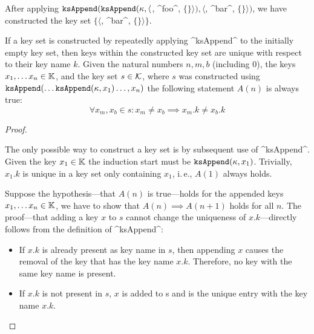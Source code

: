 \begin{example}
After applying $\texttt{ksAppend} (\texttt{ksAppend} (\kappa, \langle$, ^foo^, $\{ \}\rangle), \langle$\linebreak{}, ^bar^, $\{ \}\rangle)$, we have constructed the key set $\{ \langle$, ^bar^, $\{ \}\rangle \}$.
\end{example}

\begin{lemma}
If a key set is constructed by repeatedly applying ^ksAppend^ to the initially empty key set, then keys within the constructed key set are unique with respect to their key name $k$.
Given the natural numbers $n, m, b$ (including $0$), the keys $x_1, \ldots x_n \in \mathbb{K}$, and the key set $s \in \mathcal{K}$, where $s$ was constructed using $\texttt{ksAppend} (\ldots \texttt{ksAppend} (\kappa, x_1)  \ldots, x_n)$ the following statement $A(n)$ is always true:
\begin{equation}
\forall x_m, x_b \in s : x_m \neq x_b \implies x_m.k \neq x_b.k
\end{equation}
\vspace{-2em}
\end{lemma}

\begin{proof}
\begin{description}[font=\textit]
\item[Base case:] The only possible way to construct a key set is by subsequent use of ^ksAppend^.
Given the key $x_1 \in \mathbb{K}$ the induction start must be $\texttt{ksAppend} (\kappa, x_1)$.
Trivially, $x_1.k$ is unique in a key set only containing $x_1$, i.\,e., $A(1)$ always holds.
\item[Induction step:] Suppose the hypothesis---that $A(n)$ is true---holds for the appended keys $x_1, \ldots x_n \in \mathbb{K}$, we have to show that $A(n) \implies A(n+1)$ holds for all $n$.
The proof---that adding a key $x$ to $s$ cannot change the uniqueness of $x.k$---directly follows from the definition of ^ksAppend^:
\begin{itemize}
\item If $x.k$ is already present as key name in $s$, then appending $x$ causes the removal of the key that has the key name $x.k$.
Therefore, no key with the same key name is present.
\item If $x.k$ is not present in $s$, $x$ is added to s and is the unique entry with the key name $x.k$.
\end{itemize}
\end{description}
\end{proof}


